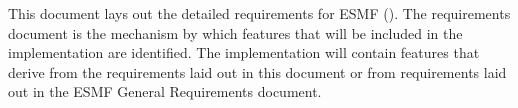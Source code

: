 
This document lays out the detailed requirements for  
ESMF \longname (\funcname).  The \funcname requirements document is the 
mechanism by which features 
that will be included in the \funcname implementation are identified. 
The \funcname implementation will contain features that derive from the 
requirements laid out in this document or from requirements 
laid out in the ESMF General Requirements document.







